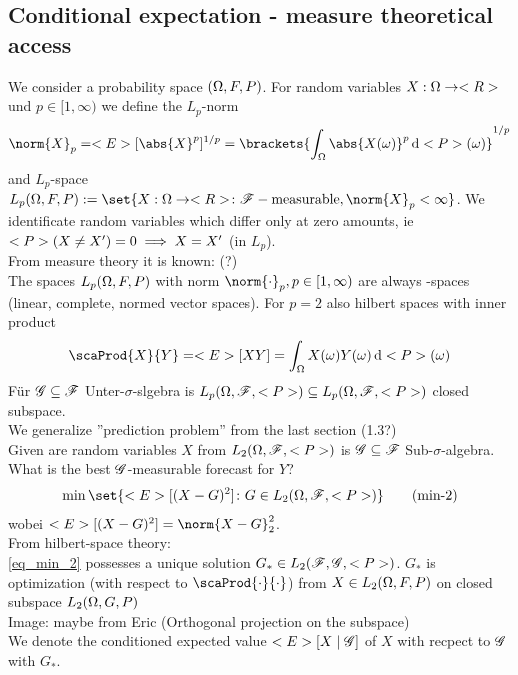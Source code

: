 \subsection{Conditional expectation - measure theoretical access}
We consider a probability space $(\O, F,P)$. For random variables $X: \O \to \R$ und $p \in [1,\infty)$ we define the $L_p$-norm
\begin{align*}
	\norm{X}_p = \E[\abs{X}^p]^{1/p} = \brackets{\int_{\O} \abs{X(\omega)}^p \d \P(\omega)}^{1/p}
\end{align*}
and $L_p$-space $L_p(\O,F,P):= \set{X: \O \to \R\colon \F-\text{measurable}, \norm{X}_p < \infty}$. We identificate random variables which differ only at zero amounts, ie $\P(X \neq X') = 0 \implies X = X'$ (in $L_p$).\\
From measure theory it is known: (?)\\
The spaces $L_p(\O,F,P)$ with norm $\norm{\cdot}_p, p \in [1,\infty)$ are always -spaces (linear, complete, normed vector spaces). For $p = 2$ also hilbert spaces with inner product
\begin{align*}
	\scaProd{X}{Y} = \E[XY] = \int_{\O} X(\omega)Y(\omega)\d \P(\omega)
\end{align*}
Für $\G \subseteq \F$ Unter-$\sigma$-slgebra is $L_p(\O,\F,\P) \subseteq L_p(\O,\F,\P)$ closed subspace.\\
We generalize ''prediction problem'' from the last section (1.3?)\\
Given are random variables $X$ from $L_2(\O,\F,\P)$ is $\G \subseteq \F$ Sub-$\sigma$-algebra.\\
What is the best $\G$-measurable forecast for $Y$?
\begin{align*}
	\min\set{\E[(X-G)^2] \colon G \in L_2(\O,\F,\P)} \tag{min-2}\label{eq_min_2}
\end{align*}
wobei $\E[(X-G)^2] = \norm{X-G}^2_2$.\\
From hilbert-space theory:\\
\eqref{eq_min_2} possesses a unique solution $G_{\ast} \in L_2(\F,\G,\P)$. $G_{\ast}$ is optimization (with respect to $\scaProd{\cdot}{\cdot}$) from $X \in L_2(\O,F,P)$ on closed subspace $L_2(\O,G,P)$\\
Image: maybe from Eric (Orthogonal projection on the subspace)\\
We denote the conditioned expected value $\E[X\mid \G]$ of $X$ with recpect to $\G$ with $G_{\ast}$.
